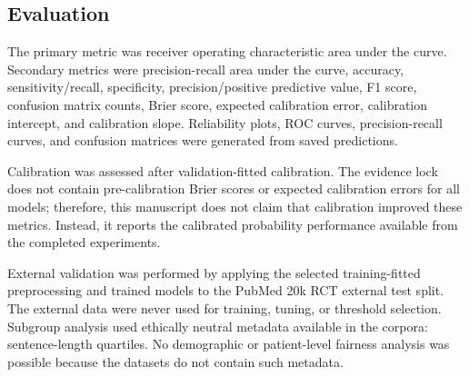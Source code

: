 \subsection*{Evaluation}
The primary metric was receiver operating characteristic area under the curve. Secondary metrics were precision-recall area under the curve, accuracy, sensitivity/recall, specificity, precision/positive predictive value, F1 score, confusion matrix counts, Brier score, expected calibration error, calibration intercept, and calibration slope. Reliability plots, ROC curves, precision-recall curves, and confusion matrices were generated from saved predictions.

Calibration was assessed after validation-fitted calibration. The evidence lock does not contain pre-calibration Brier scores or expected calibration errors for all models; therefore, this manuscript does not claim that calibration improved these metrics. Instead, it reports the calibrated probability performance available from the completed experiments.

External validation was performed by applying the selected training-fitted preprocessing and trained models to the PubMed 20k RCT external test split. The external data were never used for training, tuning, or threshold selection. Subgroup analysis used ethically neutral metadata available in the corpora: sentence-length quartiles. No demographic or patient-level fairness analysis was possible because the datasets do not contain such metadata.
